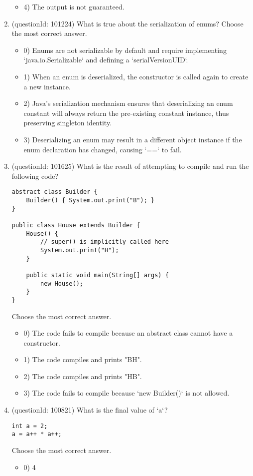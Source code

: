 \documentclass[12pt]{article}
\begin{document}
\begin{enumerate}[label=(\arabic*)]
\begin{itemize}
\item 4) The output is not guaranteed.

\end{itemize}
\item (questionId: 101224) What is true about the serialization of enums?
Choose the most correct answer. 
\begin{itemize}
\item 0) Enums are not serializable by default and require implementing `java.io.Serializable` and defining a `serialVersionUID`.

\item 1) When an enum is deserialized, the constructor is called again to create a new instance.

\item 2) Java's serialization mechanism ensures that deserializing an enum constant will always return the pre-existing constant instance, thus preserving singleton identity.

\item 3) Deserializing an enum may result in a different object instance if the enum declaration has changed, causing `==` to fail.

\end{itemize}
\item (questionId: 101625) What is the result of attempting to compile and run the following code?\n\begin{verbatim}
abstract class Builder {
    Builder() { System.out.print("B"); }
}

public class House extends Builder {
    House() {
        // super() is implicitly called here
        System.out.print("H");
    }

    public static void main(String[] args) {
        new House();
    }
}
\end{verbatim}
Choose the most correct answer. 
\begin{itemize}
\item 0) The code fails to compile because an abstract class cannot have a constructor.

\item 1) The code compiles and prints "BH".

\item 2) The code compiles and prints "HB".

\item 3) The code fails to compile because `new Builder()` is not allowed.

\end{itemize}
\item (questionId: 100821) What is the final value of `a`?\n\begin{verbatim}
int a = 2;
a = a++ * a++;
\end{verbatim}
Choose the most correct answer. 
\begin{itemize}
\item 0) 4


\end{itemize}
\end{enumerate}
\end{document}
